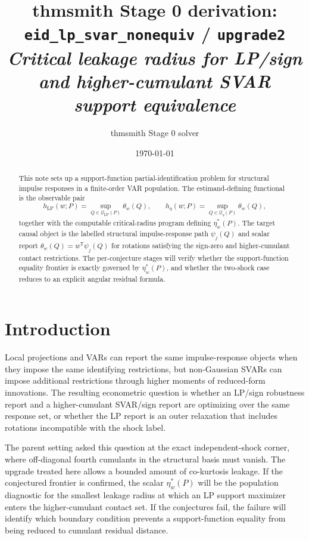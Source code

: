 \documentclass[11pt]{article}
\title{thmsmith Stage 0 derivation: \texttt{eid\_lp\_svar\_nonequiv} / \texttt{upgrade2}%
  \\ \large\textit{Critical leakage radius for LP/sign and higher-cumulant SVAR support equivalence}}
\author{thmsmith Stage 0 solver}
\date{\today}
\newcommand{\transpose}{\mathsf{T}}
\theoremstyle{definition}
\theoremstyle{plain}
\theoremstyle{remark}
\begin{document}
\maketitle


\begin{abstract}
This note sets up a support-function partial-identification problem for structural impulse responses in a finite-order VAR population.  The estimand-defining functional is the observable pair
\[
h_{\mathrm{LP}}(w;P)=\sup_{Q\in\mathcal Q_{\mathrm{LP}}(P)}\theta_w(Q),
\qquad
h_\eta(w;P)=\sup_{Q\in\mathcal Q_\eta(P)}\theta_w(Q),
\]
together with the computable critical-radius program defining \(\eta_w^*(P)\).  The target causal object is the labelled structural impulse-response path \(\psi_j(Q)\) and scalar report \(\theta_w(Q)=w^\transpose\psi_j(Q)\) for rotations satisfying the sign-zero and higher-cumulant contact restrictions.  The per-conjecture stages will verify whether the support-function equality frontier is exactly governed by \(\eta_w^*(P)\), and whether the two-shock case reduces to an explicit angular residual formula.
\end{abstract}

\section{Introduction}
Local projections and VARs can report the same impulse-response objects when they impose the same identifying restrictions, but non-Gaussian SVARs can impose additional restrictions through higher moments of reduced-form innovations.  The resulting econometric question is whether an LP/sign robustness report and a higher-cumulant SVAR/sign report are optimizing over the same response set, or whether the LP report is an outer relaxation that includes rotations incompatible with the shock label.

The parent setting asked this question at the exact independent-shock corner, where off-diagonal fourth cumulants in the structural basis must vanish.  The upgrade treated here allows a bounded amount of co-kurtosis leakage.  If the conjectured frontier is confirmed, the scalar \(\eta_w^*(P)\) will be the population diagnostic for the smallest leakage radius at which an LP support maximizer enters the higher-cumulant contact set.  If the conjectures fail, the failure will identify which boundary condition prevents a support-function equality from being reduced to cumulant residual distance.
\end{document}
